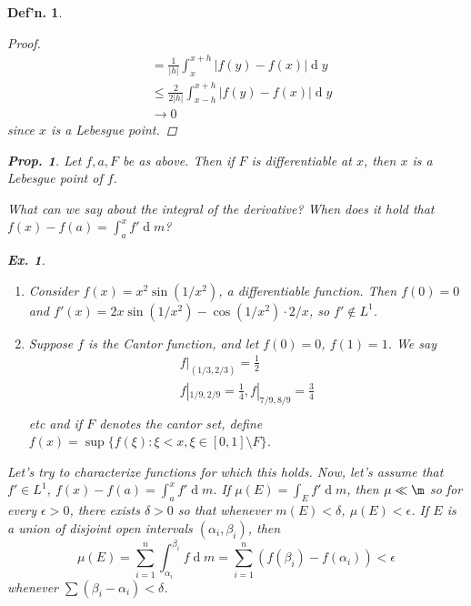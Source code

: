 \documentclass[12pt, a4paper]{book}
\renewcommand{\d}[1]{\ensuremath{\operatorname{d}\!{#1}}} %
\newtheorem{definition}[theorem]{Def'n.}
\newtheorem{proposition}[theorem]{Prop.}
\newtheorem{example}[theorem]{Ex.}
\theoremstyle{nonumberplain}
\newtheorem{proof}{Proof}
\begin{document}
\begin{definition}
\begin{proof}
\begin{align*}
                                                          &= \frac{1}{|h|}\int_x^{x+h}|f(y)-f(x)|\d{y}\\
                                                          &\leq \frac{2}{2|h|}\int_{x-h}^{x+h}|f(y)-f(x)|\d{y}\\
                                                          &\to 0
    \end{align*}
    since $x$ is a Lebesgue point.
\end{proof}
\begin{proposition}
    Let $f,a,F$ be as above.
    Then if $F$ is differentiable at $x$, then $x$ is a Lebesgue point of $f$.
\end{proposition}
What can we say about the integral of the derivative?
When does it hold that $f(x)-f(a)=\int_a^x f'\d{m}$?
\begin{example}
    \begin{enumerate}
        \item Consider $f(x)=x^2\sin(1/x^2)$, a differentiable function.
            Then $f(0)=0$ and $f'(x)=2x\sin(1/x^2)-\cos(1/x^2)\cdot 2/x$, so $f'\notin L^1$.
        \item Suppose $f$ is the Cantor function, and let $f(0)=0$, $f(1)=1$.
            We say
            \begin{align*}
                f|_{(1/3,2/3)}=\frac{1}{2}\\
                f|_{1/9,2/9} = \frac{1}{4},f|_{7/9,8/9}=\frac{3}{4}\\
            \end{align*}
            etc and if $F$ denotes the cantor set, define $f(x)=\sup\{f(\xi):\xi<x,\xi\in[0,1]\setminus F\}$.
    \end{enumerate}
\end{example}
Let's try to characterize functions for which this holds.
Now, let's assume that $f'\in L^1$, $f(x)-f(a)=\int_a^x f'\d{m}$.
If $\mu(E)=\int_E f'\d{m}$, then $\mu\ll\m$ so for every $\epsilon>0$, there exists $\delta>0$ so that whenever $m(E)<\delta$, $\mu(E)<\epsilon$.
If $E$ is a union of disjoint open intervals $(\alpha_i,\beta_i)$, then
\[\mu(E)=\sum\limits_{i=1}^n \int_{\alpha_i}^{\beta_i}f\d{m}=\sum\limits_{i=1}^n(f(\beta_i)-f(\alpha_i))<\epsilon\]
whenever $\sum(\beta_i-\alpha_i)<\delta$.

\end{definition}
\end{document}
